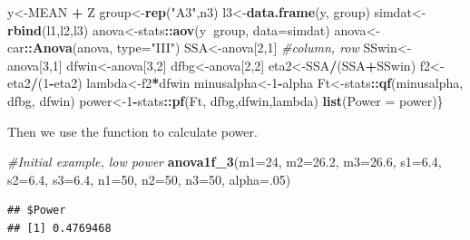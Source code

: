 \documentclass[]{book}
\newenvironment{Shaded}{\begin{snugshade}}{\end{snugshade}}
\newcommand{\CommentTok}[1]{\textcolor[rgb]{0.56,0.35,0.01}{\textit{#1}}}
\newcommand{\DataTypeTok}[1]{\textcolor[rgb]{0.13,0.29,0.53}{#1}}
\newcommand{\DecValTok}[1]{\textcolor[rgb]{0.00,0.00,0.81}{#1}}
\newcommand{\FloatTok}[1]{\textcolor[rgb]{0.00,0.00,0.81}{#1}}
\newcommand{\KeywordTok}[1]{\textcolor[rgb]{0.13,0.29,0.53}{\textbf{#1}}}
\newcommand{\NormalTok}[1]{#1}
\newcommand{\OperatorTok}[1]{\textcolor[rgb]{0.81,0.36,0.00}{\textbf{#1}}}
\newcommand{\StringTok}[1]{\textcolor[rgb]{0.31,0.60,0.02}{#1}}
\begin{document}
\begin{Shaded}
\begin{Highlighting}[]
\NormalTok{y<-MEAN }\OperatorTok{+}\StringTok{ }\NormalTok{Z}
\NormalTok{group<-}\KeywordTok{rep}\NormalTok{(}\StringTok{"A3"}\NormalTok{,n3)}
\NormalTok{l3<-}\KeywordTok{data.frame}\NormalTok{(y, group)}
\NormalTok{simdat<-}\KeywordTok{rbind}\NormalTok{(l1,l2,l3)}
\NormalTok{anova<-stats}\OperatorTok{::}\KeywordTok{aov}\NormalTok{(y}\OperatorTok{~}\NormalTok{group, }\DataTypeTok{data=}\NormalTok{simdat)}
\NormalTok{anova<-car}\OperatorTok{::}\KeywordTok{Anova}\NormalTok{(anova, }\DataTypeTok{type=}\StringTok{"III"}\NormalTok{)}
\NormalTok{SSA<-anova[}\DecValTok{2}\NormalTok{,}\DecValTok{1}\NormalTok{] }\CommentTok{#column, row}
\NormalTok{SSwin<-anova[}\DecValTok{3}\NormalTok{,}\DecValTok{1}\NormalTok{]}
\NormalTok{dfwin<-anova[}\DecValTok{3}\NormalTok{,}\DecValTok{2}\NormalTok{]}
\NormalTok{dfbg<-anova[}\DecValTok{2}\NormalTok{,}\DecValTok{2}\NormalTok{]}
\NormalTok{eta2<-SSA}\OperatorTok{/}\NormalTok{(SSA}\OperatorTok{+}\NormalTok{SSwin)}
\NormalTok{f2<-eta2}\OperatorTok{/}\NormalTok{(}\DecValTok{1}\OperatorTok{-}\NormalTok{eta2)}
\NormalTok{lambda<-f2}\OperatorTok{*}\NormalTok{dfwin}
\NormalTok{minusalpha<-}\DecValTok{1}\OperatorTok{-}\NormalTok{alpha}
\NormalTok{Ft<-stats}\OperatorTok{::}\KeywordTok{qf}\NormalTok{(minusalpha, dfbg, dfwin)}
\NormalTok{power<-}\DecValTok{1}\OperatorTok{-}\NormalTok{stats}\OperatorTok{::}\KeywordTok{pf}\NormalTok{(Ft, dfbg,dfwin,lambda)}
\KeywordTok{list}\NormalTok{(}\DataTypeTok{Power =}\NormalTok{ power)\}}
\end{Highlighting}
\end{Shaded}

Then we use the function to calculate power.

\begin{Shaded}
\begin{Highlighting}[]
\CommentTok{#Initial example, low power}
\KeywordTok{anova1f_3}\NormalTok{(}\DataTypeTok{m1=}\DecValTok{24}\NormalTok{, }\DataTypeTok{m2=}\FloatTok{26.2}\NormalTok{, }\DataTypeTok{m3=}\FloatTok{26.6}\NormalTok{, }\DataTypeTok{s1=}\FloatTok{6.4}\NormalTok{, }\DataTypeTok{s2=}\FloatTok{6.4}\NormalTok{, }\DataTypeTok{s3=}\FloatTok{6.4}\NormalTok{, }\DataTypeTok{n1=}\DecValTok{50}\NormalTok{, }\DataTypeTok{n2=}\DecValTok{50}\NormalTok{, }\DataTypeTok{n3=}\DecValTok{50}\NormalTok{, }\DataTypeTok{alpha=}\NormalTok{.}\DecValTok{05}\NormalTok{)}
\end{Highlighting}
\end{Shaded}

\begin{verbatim}
## $Power
## [1] 0.4769468
\end{verbatim}
\end{document}
